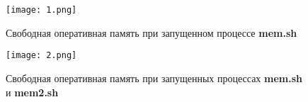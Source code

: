 \documentclass{article}
\begin{document}
\begin{figure}
    \centering
    \texttt{[image: 1.png]}
    \caption{Свободная оперативная память при запущенном процессе \textbf{mem.sh}}
    \label{fig:enter-label}
\end{figure}

\begin{figure}
    \centering
    \texttt{[image: 2.png]}
    \caption{Свободная оперативная память при запущенных процессах \textbf{mem.sh} и \textbf{mem2.sh}}
    \label{fig:enter-label}
\end{figure}
\end{document}
